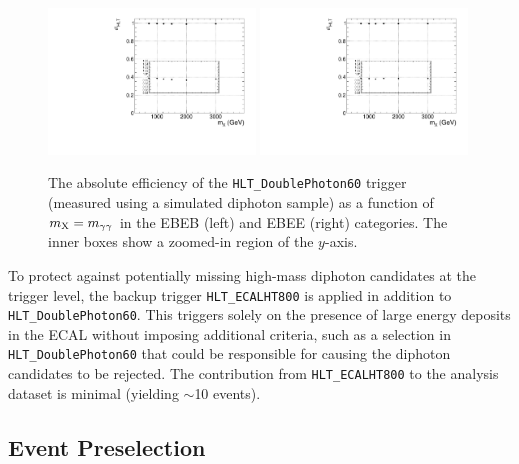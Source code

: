 \begin{figure}[!htbp]
	\centering
  	\includegraphics[angle=0,width=0.49\textwidth]{figures/eff_dipho60_EBEB_vs_mass}
	\includegraphics[angle=0,width=0.49\textwidth]{figures/eff_dipho60_EBEE_vs_mass}
	\caption{The absolute efficiency of the \texttt{HLT\_DoublePhoton60} trigger (measured using a simulated diphoton sample) as a function of $m_\mathrm{X} =m_{\gamma\gamma}$ in the EBEB (left) and EBEE (right) categories. The inner boxes show a zoomed-in region of the $y$-axis.}
	\label{fig:absolute_trigger_efficiency}
\end{figure}

To protect against potentially missing high-mass diphoton candidates at the trigger level, the backup trigger \texttt{HLT\_ECALHT800} is applied in addition to \texttt{HLT\_DoublePhoton60}. This triggers solely on the presence of large energy deposits in the ECAL without imposing additional criteria, such as a selection in \texttt{HLT\_DoublePhoton60} that could be responsible for causing the diphoton candidates to be rejected. The contribution from \texttt{HLT\_ECALHT800} to the analysis dataset is minimal (yielding $\sim$10 events).


\subsection{Event Preselection}

